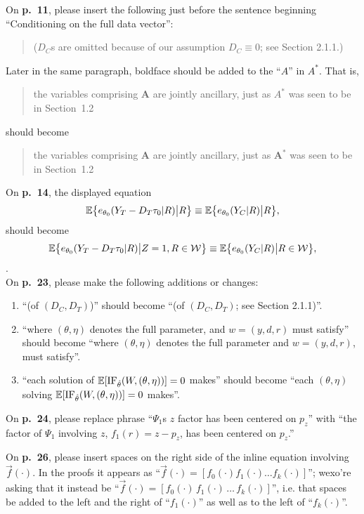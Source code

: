 \documentclass[12pt]{article}
\begin{document}
On \textbf{p.~11}, please insert the following just before the
sentence beginning ``Conditioning on the full
   data vector'':
   \begin{quote}
     ($D_C$s are omitted because of our assumption $D_C\equiv 0$; see Section 2.1.1.)
   \end{quote}
Later in the same paragraph, boldface should be added to the ``$A$''
in $A^{*}$.  That is, 
\begin{quote}
  the variables comprising $\mathbf{A}$ are jointly ancillary, just as
  $A^{*}$ was seen to be in Section~1.2
\end{quote}
should become
\begin{quote}
  the variables comprising $\mathbf{A}$ are jointly ancillary, just as
  $\mathbf{A}^{*}$ was seen to be in Section~1.2  
\end{quote}
On \textbf{p.~14}, the displayed equation  
\begin{equation*} %
\EE \big\{\dt[\thetaInf]{Y_T-D_T\tau_0}{ R } \big| R \big\}
\equiv \EE \big\{ \dt[\thetaInf]{Y_{C}}{ R } \big| R \big\},
\end{equation*}
should become 
\begin{equation*} %
\EE \big\{\dt[\thetaInf]{Y_T-D_T\tau_0}{ R } \big| Z=1, R \in \mathcal{W}\big\}
\equiv \EE \big\{ \dt[\thetaInf]{Y_{C}}{ R } \big| R \in \mathcal{W} \big\},
\end{equation*}
.\\

On \textbf{p.~23}, please make the following additions or changes:
\begin{enumerate}
\item ``(of $(D_C, D_T)$)'' should become ``(of $(D_C, D_T)$; see
  Section 2.1.1)''.
\item ``where $(\theta, \eta)$ denotes the full parameter, and $w =
({y},d,r)$ must satisfy'' should become ``where $(\theta, \eta)$
denotes the full parameter and $w = ({y},d,r)$, must satisfy''.
\item ``each solution of $\mathbb{E}[\mathrm{IF}_{\hat\theta}(W, (\theta, \eta))] =0$ makes''
  should become ``each $(\theta, \eta)$ solving $\mathbb{E}[\mathrm{IF}_{\hat\theta}(W, (\theta, \eta))] =0$
  makes''. 
\end{enumerate}

On \textbf{p.~24}, please replace phrase
   ``$\Psi_1$s $z$ factor has been centered on $p_z$''  with ``the factor of $\Psi_1$ involving $z$,
   $f_1(r) = z - p_{z}$, has been centered on $p_z$.''

On \textbf{p.~26}, please insert spaces on the right side of the
inline equation involving $\vec{f}(\cdot)$.  In the proofs it appears
as ``$\vec{f}(\cdot) = [f_{0}(\cdot) f_{1}(\cdot) \ldots
f_{k}(\cdot)]$''; wexo're asking that it instead be
``$\vec{f}(\cdot)=[f_{0}(\cdot)\, f_{1}(\cdot)\, \ldots\,
f_{k}(\cdot)]$'', i.e. that spaces be added to the left and the right
of ``$f_{1}(\cdot)$'' as well as to the left of ``$f_{k}(\cdot)$''.
\end{document}
